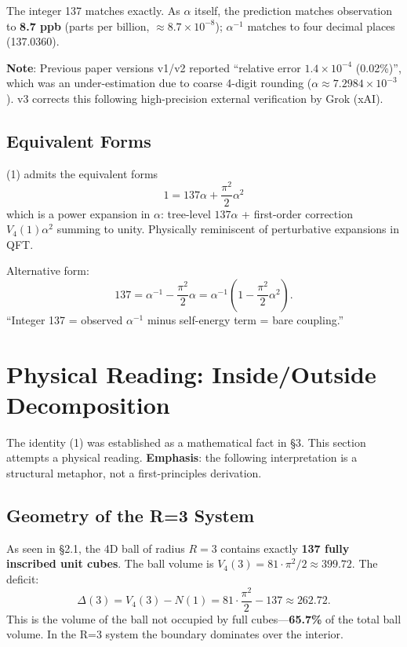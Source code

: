 \documentclass[a4paper,11pt]{article}
\begin{document}
The integer 137 matches exactly. As $\alpha$ itself, the prediction matches observation to \textbf{8.7 ppb} (parts per billion, $\approx 8.7 \times 10^{-8}$); $\alpha^{-1}$ matches to four decimal places (137.0360).

\textbf{Note}: Previous paper versions v1/v2 reported ``relative error $1.4 \times 10^{-4}$ (0.02\%)'', which was an under-estimation due to coarse 4-digit rounding ($\alpha \approx 7.2984 \times 10^{-3}$). v3 corrects this following high-precision external verification by Grok (xAI).

\subsection{Equivalent Forms}

(1) admits the equivalent forms
\begin{equation}
1 = 137 \alpha + \frac{\pi^2}{2} \alpha^2 \tag{3}
\end{equation}
which is a power expansion in $\alpha$: tree-level $137\alpha$ + first-order correction $V_4(1)\alpha^2$ summing to unity. Physically reminiscent of perturbative expansions in QFT.

Alternative form:
\begin{equation}
137 = \alpha^{-1} - \frac{\pi^2}{2} \alpha = \alpha^{-1}\left(1 - \frac{\pi^2}{2}\alpha^2\right). \tag{4}
\end{equation}
``Integer 137 = observed $\alpha^{-1}$ minus self-energy term = bare coupling.''

\section{Physical Reading: Inside/Outside Decomposition}

The identity (1) was established as a mathematical fact in §3. This section attempts a physical reading. \textbf{Emphasis}: the following interpretation is a structural metaphor, not a first-principles derivation.

\subsection{Geometry of the R=3 System}

As seen in §2.1, the 4D ball of radius $R=3$ contains exactly \textbf{137 fully inscribed unit cubes}. The ball volume is $V_4(3) = 81 \cdot \pi^2/2 \approx 399.72$. The deficit:
\[ \Delta(3) = V_4(3) - N(1) = 81 \cdot \frac{\pi^2}{2} - 137 \approx 262.72. \]
This is the volume of the ball not occupied by full cubes---\textbf{65.7\%} of the total ball volume. In the R=3 system the boundary dominates over the interior.
\end{document}
